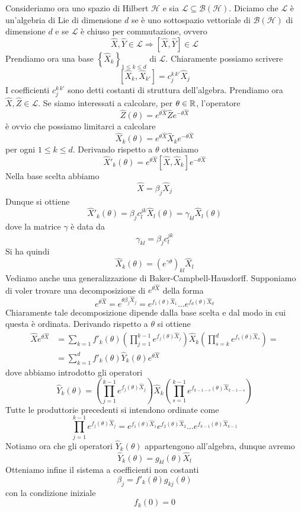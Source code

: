 \documentclass[a4paper, 11pt]{article}
\newcommand{\op}[1]{\hat{#1}}
\renewcommand{\H}{\mathcal{H}}
\renewcommand{\op}[1]{\hat{#1}}
\begin{document}
Consideriamo ora uno spazio di Hilbert $\H$ e sia $\mathcal{L}\subseteq\mathcal{B}(\H)$. Diciamo che $\mathcal{L}$ è un'algebria di Lie di dimensione $d$ se è uno sottospazio vettoriale di $\mathcal{B}(\H)$ di dimensione $d$ e se $\mathcal{L}$ è chiuso per commutazione, ovvero
\[\op{X},\op{Y}\in\mathcal{L}\Rightarrow[\op{X},\op{Y}]\in\mathcal{L}\]
Prendiamo ora una base $\left\{\op X_k\right\}_{1\leq k\leq d}$ di $\mathcal{L}$. Chiaramente possiamo scrivere 
\[[\op{X}_k,\op{X}_{k'}]=c^{k\,k'}_j\op{X}_j\]
I coefficienti $c^{k\,k'}_j$ sono detti costanti di struttura dell'algebra. Prendiamo ora $\op X,\op Z\in\mathcal{L}$. Se siamo interessati a calcolare, per $\theta\in\mathbb{R}$, l'operatore
\[\op{Z}(\theta)=e^{\theta\op X}\op Ze^{-\theta\op X}\]
è ovvio che possiamo limitarci a calcolare
\[\op X_k(\theta)=e^{\theta\op X}\op X_ke^{-\theta\op X}\]
per ogni $1\leq k\leq d$. Derivando rispetto a $\theta$ otteniamo
\[\op X'_k(\theta)=e^{\theta\op X}[\op X,\op X_k]e^{-\theta\op X}\]
Nella base scelta abbiamo
\[\op X=\beta_j\op X_j\]
Dunque si ottiene
\[\op X'_k(\theta)=\beta_jc^{jk}_l\op X_l(\theta)=\gamma_{kl}\op X_l(\theta)\]
dove la matrice $\gamma$ è data da
\[\gamma_{kl}=\beta_jc^{jk}_l\]
Si ha quindi
\[\op X_k(\theta)=\left(e^{\gamma\theta}\right)_{kl}\op X_l\]
Vediamo anche una generalizzazione di Baker-Campbell-Hausdorff. Supponiamo di voler trovare una decomposizione di $e^{\theta\hat{X}}$ della forma
\[e^{\theta\op X}=e^{\theta\beta_j\op X_j}=e^{f_1(\theta)\op X_1}\dots e^{f_d(\theta)\op X_d}\]
Chiaramente tale decomposizione dipende dalla base scelta e dal modo in cui questa è ordinata. Derivando rispetto a $\theta$ si ottiene
\begin{align*}\op Xe^{\theta\op X}&=\sum_{k=1}^{}f'_k(\theta)\left(\prod_{j=1}^{k-1}e^{f_j(\theta)\op X_j}\right)\op X_k\left(\prod_{s=k}^{d}e^{f_s(\theta)\op X_s}\right)=\\&=\sum_{k=1}^{d}f'_k(\theta)\op Y_k(\theta)e^{\theta\op X}\end{align*}
dove abbiamo introdotto gli operatori
\[\op Y_k(\theta)=\left(\prod_{j=1}^{k-1}e^{f_j(\theta)\op X_j}\right)\op X_k\left(\prod_{s=1}^{k-1}e^{f_{k-1-s}(\theta)\op X_{k-1-s}}\right)\]
Tutte le produttorie precedenti si intendono ordinate come
\[\prod_{j=1}^{k-1}e^{f_j(\theta)\op X_j}=e^{f_1(\theta)\op X_1}e^{f_2(\theta)\op X_2}\dots e^{f_{k-1}(\theta)\op X_{k-1}}\]
Notiamo ora che gli operatori $\op Y_k(\theta)$ appartengono all'algebra, dunque avremo
\[\op Y_k(\theta)=g_{kl}(\theta)\op X_l\]
Otteniamo infine il sistema a coefficienti non costanti
\[\beta_j=f'_k(\theta)g_{kj}(\theta)\]
con la condizione iniziale
\[f_k(0)=0\]
\end{document}
